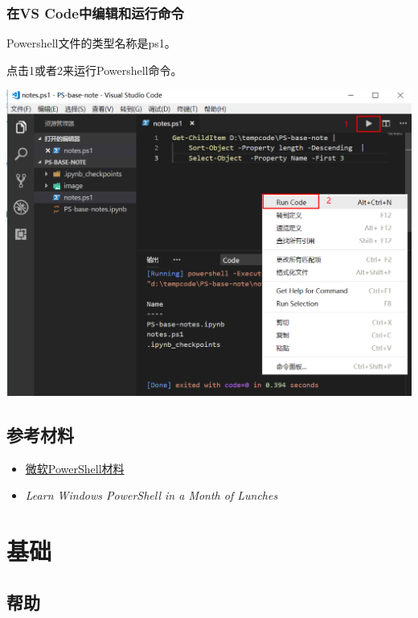 \documentclass[11pt]{ctexart}
\makeatletter
\def\maxwidth{\ifdim\Gin@nat@width>\linewidth\linewidth
    \else\Gin@nat@width\fi}
\let\Oldincludegraphics\includegraphics
\renewcommand{\includegraphics}[1]{\Oldincludegraphics[width=.8\maxwidth]{#1}}
\providecommand{\tightlist}{%
      \setlength{\itemsep}{0pt}\setlength{\parskip}{0pt}}
\makeatother
\begin{document}
    \hypertarget{ux5728vs-codeux4e2dux7f16ux8f91ux548cux8fd0ux884cux547dux4ee4}{%
\subsubsection{在VS
Code中编辑和运行命令}\label{ux5728vs-codeux4e2dux7f16ux8f91ux548cux8fd0ux884cux547dux4ee4}}

Powershell文件的类型名称是ps1。

点击1或者2来运行Powershell命令。

    \includegraphics{image/ps4-run.png}

    \hypertarget{ux53c2ux8003ux6750ux6599}{%
\subsection{参考材料}\label{ux53c2ux8003ux6750ux6599}}

\begin{itemize}
\tightlist
\item
  \href{https://docs.microsoft.com/zh-cn/powershell/scripting/powershell-scripting?view=powershell-6}{微软PowerShell材料}
\item
  \emph{Learn Windows PowerShell in a Month of Lunches}
\end{itemize}

    \hypertarget{ux57faux7840}{%
\section{基础}\label{ux57faux7840}}

    \hypertarget{ux5e2eux52a9}{%
\subsection{帮助}\label{ux5e2eux52a9}}
\end{document}
